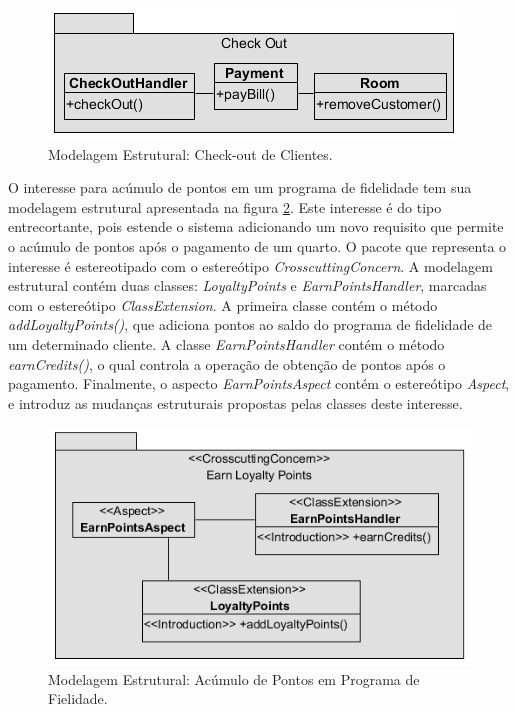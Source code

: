   \begin{figure}
	\centering
	\includegraphics{img/case_study_structural_check_out.png}
	\caption{Modelagem Estrutural: Check-out de Clientes.}\label{fig:case_study_structural_check_out}
  \end{figure}

O interesse para acúmulo de pontos em um programa de fidelidade tem sua modelagem estrutural apresentada na figura
\ref{fig:case_study_structural_earn_points}. Este interesse é do tipo entrecortante, pois estende o sistema adicionando um novo requisito que
permite o acúmulo de pontos após o pagamento de um quarto. O pacote que representa o interesse é estereotipado com o estereótipo
\textit{CrosscuttingConcern}. A modelagem estrutural contém duas classes: \textit{LoyaltyPoints} e \textit{EarnPointsHandler}, marcadas com o
estereótipo \textit{ClassExtension}. A primeira classe contém o método \textit{addLoyaltyPoints()}, que adiciona pontos ao saldo do programa de
fidelidade de um determinado cliente. A classe \textit{EarnPointsHandler} contém o método \textit{earnCredits()}, o qual controla a operação de
obtenção de pontos após o pagamento. Finalmente, o aspecto \textit{EarnPointsAspect} contém o estereótipo \textit{Aspect}, e introduz as mudanças
estruturais propostas pelas classes deste interesse.

  \begin{figure}
	\centering
	\includegraphics{img/case_study_structural_earn_points.png}
	\caption{Modelagem Estrutural: Acúmulo de Pontos em Programa de Fielidade.}\label{fig:case_study_structural_earn_points}
  \end{figure}

